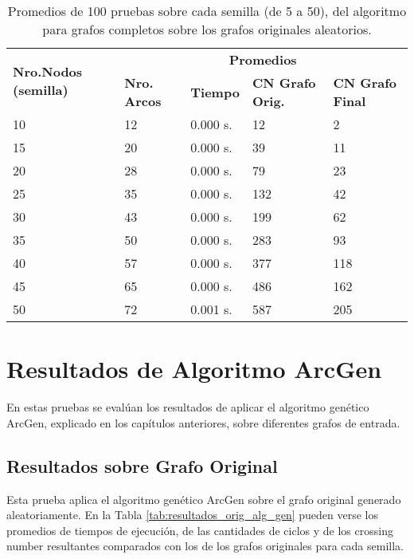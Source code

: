 \begin{table}[H]
	\caption{Promedios de 100 pruebas sobre cada semilla (de 5 a 50), del algoritmo para grafos completos sobre los grafos originales aleatorios.}
	\label{tab:resultados_orig_alg_com}
	\begin{tabularx}{\linewidth}{|X|X|p{1.5cm}|X|X|}
		\hline
		\multirow{2}{2cm}{\textbf{Nro.Nodos (semilla)}} & \multicolumn{4}{c|}{\textbf{Promedios}} \\
		\cline{2-5}
		& \textbf{Nro. Arcos} & \textbf{Tiempo} & \textbf{CN Grafo Orig.} & \textbf{CN Grafo Final} \\
		\hline
		10 & 12 & 0.000 s. & 12 & 2 \\
		\hline
		15 & 20 & 0.000 s. & 39 & 11 \\
		\hline
		20 & 28 & 0.000 s. & 79 & 23 \\
		\hline
		25 & 35 & 0.000 s. & 132 & 42 \\
		\hline
		30 & 43 & 0.000 s. & 199 & 62 \\
		\hline
		35 & 50 & 0.000 s. & 283 & 93 \\
		\hline
		40 & 57 & 0.000 s. & 377 & 118 \\
		\hline
		45 & 65 & 0.000 s. & 486 & 162 \\
		\hline
		50 & 72 & 0.001 s. & 587 & 205 \\
		\hline
	\end{tabularx}
\end{table}

\section{Resultados de Algoritmo ArcGen}
En estas pruebas se evalúan los resultados de aplicar el algoritmo genético ArcGen, explicado en los capítulos anteriores, sobre diferentes grafos de entrada.

\subsection{Resultados sobre Grafo Original}
Esta prueba aplica el algoritmo genético ArcGen sobre el grafo original generado aleatoriamente. En la Tabla \ref{tab:resultados_orig_alg_gen} pueden verse los promedios de tiempos de ejecución, de las cantidades de ciclos y de los crossing number resultantes comparados con los de los grafos originales para cada semilla.

